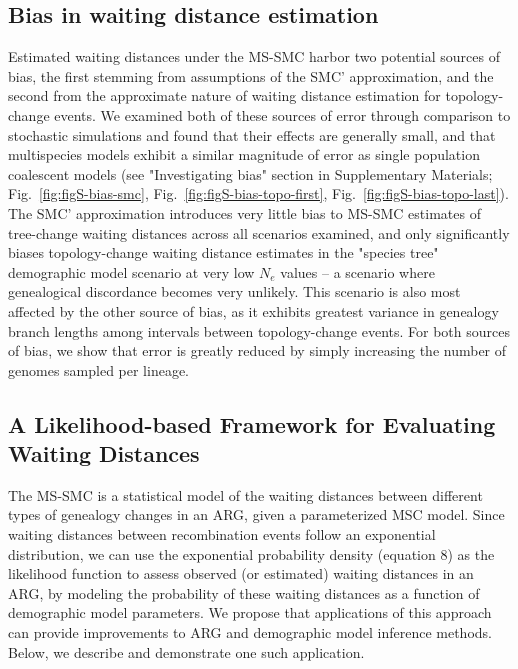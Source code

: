 \documentclass[11pt]{article}
\begin{document}
\subsection{Bias in waiting distance estimation}
Estimated waiting distances under the MS-SMC harbor two potential sources of bias, 
the first stemming from assumptions of the SMC' approximation, and the second from 
the approximate nature of waiting distance estimation for topology-change events. 
We examined both of these sources of error through comparison to stochastic simulations
and found that their effects are generally small, and that multispecies models exhibit 
a similar magnitude of error as single population coalescent models 
(see "Investigating bias" section in Supplementary Materials; 
Fig.~\ref{fig:figS-bias-smc}, 
Fig.~\ref{fig:figS-bias-topo-first}, 
Fig.~\ref{fig:figS-bias-topo-last}).
The SMC' approximation introduces very little bias to MS-SMC estimates of 
tree-change waiting distances across all scenarios examined, and only 
significantly biases topology-change waiting distance estimates in the 
"species tree" demographic model scenario at very low $N_e$ values -- a 
scenario where genealogical discordance becomes very unlikely. 
This scenario is also most affected by the other source of bias, as
it exhibits greatest variance in genealogy branch lengths among
intervals between topology-change events. For both sources of bias, 
we show that error is greatly reduced by simply increasing the number
of genomes sampled per lineage.


\subsection{A Likelihood-based Framework for Evaluating Waiting Distances}

The MS-SMC is a statistical model of the waiting distances between different
types of genealogy changes in an ARG, given a parameterized MSC model. 
Since waiting distances between recombination events follow an exponential 
distribution, we can use the exponential probability density (equation 8) 
as the likelihood function to assess observed (or estimated) waiting
distances in an ARG, by modeling the probability of these waiting distances
as a function of demographic model parameters.
We propose that applications of this approach can provide 
improvements to ARG and demographic model inference methods. Below, we
describe and demonstrate one such application.
\end{document}
